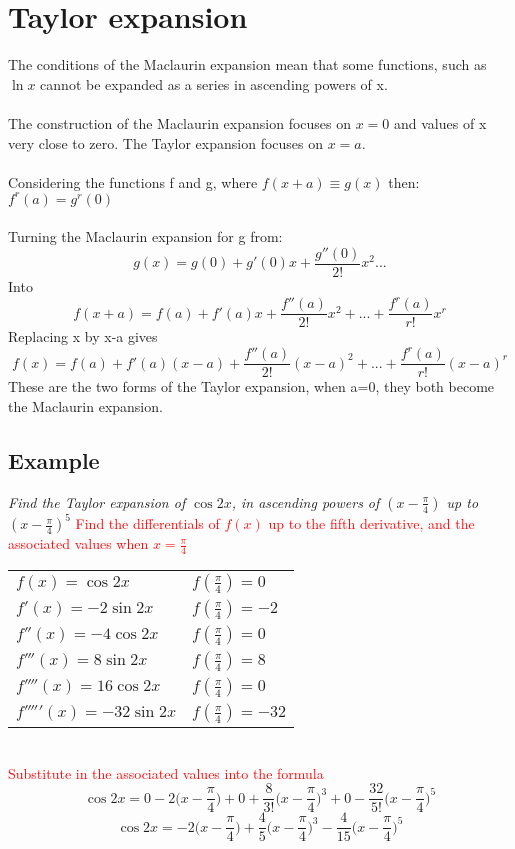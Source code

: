 \documentclass{article}[18pt]
\begin{document}
\section{Taylor expansion}
The conditions of the Maclaurin expansion mean that some functions, such as $\ln x$ cannot be expanded as a series in ascending powers of x.\\
\\
The construction of the Maclaurin expansion focuses on $x=0$ and values of x very close to zero. The Taylor expansion focuses on $x=a$.\\
\\
Considering the functions f and g, where $f(x+a)\equiv g(x)$ then:\\
$f^r(a)=g^r(0)$\\
\\
Turning the Maclaurin expansion for g from:
$$g(x)=g(0)+g'(0)x+\frac{g''(0)}{2!}x^2...$$
Into
$$f(x+a)=f(a)+f'(a)x+\frac{f''(a)}{2!}x^2+...+\frac{f^r(a)}{r!}x^r$$
Replacing x by x-a gives
$$f(x)=f(a)+f'(a)(x-a)+\frac{f''(a)}{2!}(x-a)^2+...+\frac{f^r(a)}{r!}(x-a)^r$$
These are the two forms of the Taylor expansion, when a=0, they both become the Maclaurin expansion.
\subsection{Example}
\textit{Find the Taylor expansion of $\cos2x$, in ascending powers of $(x-\frac{\pi}{4})$ up to $(x-\frac{\pi}{4})^5$}
\textcolor{red}{Find the differentials of $f(x)$ up to the fifth derivative, and the associated values when $x=\frac{\pi}{4}$}\\
\begin{tabular}{l l}
$f(x)=\cos2x$&$f(\frac{\pi}{4})=0$\\
$f'(x)=-2\sin2x$&$f(\frac{\pi}{4})=-2$\\
$f''(x)=-4\cos2x$&$f(\frac{\pi}{4})=0$\\
$f'''(x)=8\sin2x$&$f(\frac{\pi}{4})=8$\\
$f''''(x)=16\cos2x$&$f(\frac{\pi}{4})=0$\\
$f'''''(x)=-32\sin2x$&$f(\frac{\pi}{4})=-32$
\end{tabular}\\
\textcolor{red}{Substitute in the associated values into the formula}
$$\cos2x=0-2\Big(x-\frac{\pi}{4}\Big)+0+\frac{8}{3!}\Big(x-\frac{\pi}{4}\Big)^3+0-\frac{32}{5!}\Big(x-\frac{\pi}{4}\Big)^5$$
$$\cos2x=-2\Big(x-\frac{\pi}{4}\Big)+\frac{4}{5}\Big(x-\frac{\pi}{4}\Big)^3-\frac{4}{15}\Big(x-\frac{\pi}{4}\Big)^5$$
\end{document}
